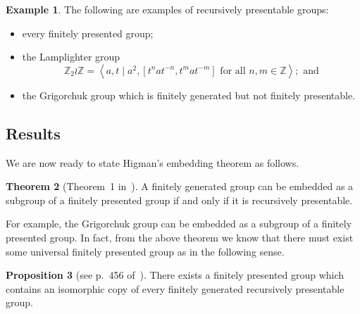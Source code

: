 \documentclass[11pt,a4paper,reqno]{amsart}
\theoremstyle{plain}
\theoremstyle{definition}
\newtheorem{theorem}{Theorem}[section]
\newtheorem{proposition}[theorem]{Proposition}
\theoremstyle{definition}
\newtheorem{example}[theorem]{Example}
\begin{document}
\begin{example}
	The following are examples of recursively presentable groups:
	\begin{itemize}
		\item every finitely presented group;
		\item the Lamplighter group
		      \[
			      \mathbb Z_2 \wr \mathbb Z
			      =
			      \left\langle
			      a,t
			      \mid
			      a^2, [t^n a t^{-n}, t^m a t^{-m}]\text{ for all }n,m\in \mathbb Z
			      \right\rangle;\text{ and}
		      \]
		\item the Grigorchuk group which is finitely generated but not finitely presentable.
	\end{itemize}
\end{example}

\subsection{Results}
We are now ready to state Higman's embedding theorem as follows.

\begin{theorem}[Theorem~1 in~\cite{higman1961}]\label{thm:higman}
	A finitely generated group can be embedded as a subgroup of a finitely presented group if and only if it is recursively presentable.
\end{theorem}

For example, the Grigorchuk group can be embedded as a subgroup of a finitely presented group.
In fact, from the above theorem we know that there must exist some universal finitely presented group as in the following sense.

\begin{proposition}[see p.~456 of~\cite{higman1961}]\label{lem:universal-pres}
	There exists a finitely presented group which contains an isomorphic copy of every finitely generated recursively presentable group.
\end{proposition}
\end{document}
